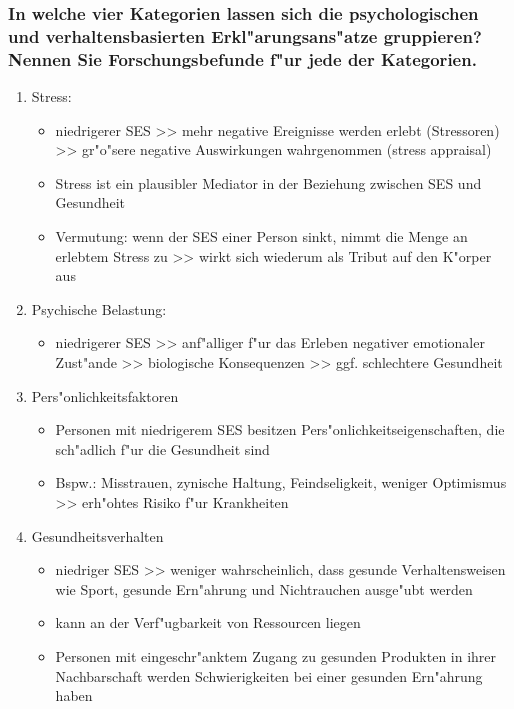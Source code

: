\subsubsection{In welche vier Kategorien lassen sich die psychologischen und verhaltensbasierten Erkl"arungsans"atze gruppieren? Nennen Sie Forschungsbefunde f"ur jede der Kategorien. }
\begin{enumerate}
        \item Stress:
                \begin{itemize}
                        \item niedrigerer SES >> mehr negative Ereignisse werden erlebt (Stressoren) >> gr"o"sere negative Auswirkungen wahrgenommen (stress appraisal)
                        \item Stress ist ein plausibler Mediator in der Beziehung zwischen SES und Gesundheit
                        \item Vermutung: wenn der SES einer Person sinkt, nimmt die Menge an erlebtem Stress zu >> wirkt sich wiederum als Tribut auf den K"orper aus
                \end{itemize}
        \item Psychische Belastung:
                \begin{itemize}
                        \item niedrigerer SES >> anf"alliger f"ur das Erleben negativer emotionaler Zust"ande >> biologische Konsequenzen >> ggf. schlechtere Gesundheit
                \end{itemize}
        \item Pers"onlichkeitsfaktoren
                \begin{itemize}
                        \item Personen mit niedrigerem SES besitzen Pers"onlichkeitseigenschaften, die sch"adlich f"ur die Gesundheit sind
                        \item Bspw.: Misstrauen, zynische Haltung, Feindseligkeit, weniger Optimismus >> erh"ohtes Risiko f"ur Krankheiten
                \end{itemize}
        \item Gesundheitsverhalten 
                \begin{itemize}
                        \item niedriger SES >> weniger wahrscheinlich, dass gesunde Verhaltensweisen wie Sport, gesunde Ern"ahrung und Nichtrauchen ausge"ubt werden
                        \item kann an der Verf"ugbarkeit von Ressourcen liegen
                        \item Personen mit eingeschr"anktem Zugang zu gesunden Produkten in ihrer Nachbarschaft werden Schwierigkeiten bei einer gesunden Ern"ahrung haben 
                \end{itemize}
\end{enumerate}

